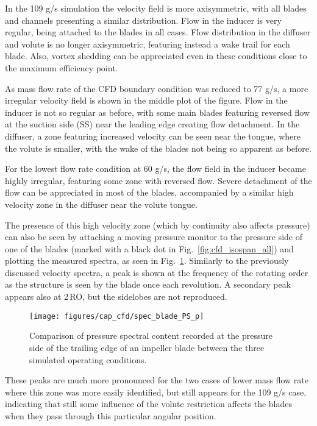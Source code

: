 In the 109 g/s simulation the velocity field is more axisymmetric, with all blades and channels presenting a similar distribution. Flow in the inducer is very regular, being attached to the blades in all cases. Flow distribution in the diffuser and volute is no longer axisymmetric, featuring instead a wake trail for each blade. Also, vortex shedding can be appreciated even in these conditions close to the maximum efficiency point.

As mass flow rate of the CFD boundary condition was reduced to 77 g/s, a more irregular velocity field is shown in the middle plot of the figure. Flow in the inducer is not so regular as before, with some main blades featuring reversed flow at the suction side (SS) near the leading edge creating flow detachment. In the diffuser, a zone featuring increased velocity can be seen near the tongue, where the volute is smaller, with the wake of the blades not being so apparent as before.

For the lowest flow rate condition at 60 g/s, the flow field in the inducer became highly irregular, featuring some zone with reversed flow. Severe detachment of the flow can be appreciated in most of the blades, accompanied by a similar high velocity zone in the diffuser near the volute tongue. 

The presence of this high velocity zone (which by continuity also affects pressure) can also be seen by attaching a moving pressure monitor to the pressure side of one of the blades (marked with a black dot in Fig.~\ref{fig:cfd_isospan_all}) and plotting the measured spectra, as seen in Fig.~\ref{fig:cfd_spec_blade_p}. Similarly to the previously discussed velocity spectra, a peak is shown at the frequency of the rotating order as the structure is seen by the blade once each revolution. A secondary peak appears also at 2\,RO, but the sidelobes are not reproduced.

\begin{figure}[htb!]
\centering
\texttt{[image: figures/cap\_cfd/spec\_blade\_PS\_p]}\\[5mm]
\caption[Pressure spectra of a trailing edge monitor]{Comparison of pressure spectral content recorded at the pressure side of the trailing edge of an impeller blade between the three simulated operating conditions.}
\label{fig:cfd_spec_blade_p}
\end{figure}

These peaks are much more pronounced for the two cases of lower mass flow rate where this zone was more easily identified, but still appears for the 109 g/s case, indicating that still some influence of the volute restriction affects the blades when they pass through this particular angular position.

